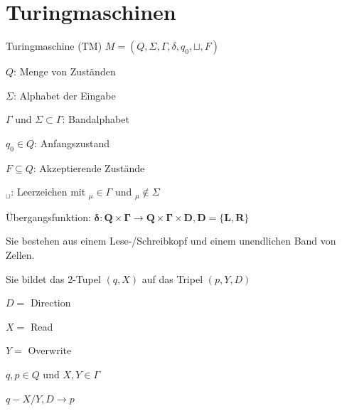 \graphicspath{{images/}}

\section*{Turingmaschinen}

\begin{theorem}{Turingmaschine (TM)} $M=\left(Q, \Sigma, \Gamma, \delta, q_{0}, \sqcup , F\right)$

    \begin{minipage}{0.45\linewidth}
        $Q$: Menge von Zuständen

        $\Sigma$: Alphabet der Eingabe

        $\Gamma$ und $\Sigma \subset \Gamma$: Bandalphabet
    \end{minipage}
    \begin{minipage}{0.55\linewidth}
        $q_{0} \in Q$: Anfangszustand

        $F \subseteq Q$: Akzeptierende Zustände

        ${ }_{\sqcup }$: Leerzeichen mit ${ }_{\mu} \in \Gamma$ und ${ }_{\mu} \notin \Sigma$
    \end{minipage}

    Übergangsfunktion: $\boldsymbol{\delta}: \boldsymbol{Q} \times \boldsymbol{\Gamma} \rightarrow \boldsymbol{Q} \times \boldsymbol{\Gamma} \times \boldsymbol{D}, \boldsymbol{D}=\{\boldsymbol{L}, \boldsymbol{R}\}$
    
    \vspace{1mm}

    Sie bestehen aus einem Lese-/Schreibkopf und einem unendlichen Band von Zellen.

    \vspace{1mm}

    Sie bildet das 2-Tupel $(q, X)$ auf das Tripel $(p, Y, D)$

    \begin{minipage}{0.45\linewidth}
        $D=$ Direction

        $X=$ Read

        $Y=$ Overwrite
    \end{minipage}
    \begin{minipage}{0.5\linewidth}
       $q, p \in Q$ und $X, Y \in \Gamma$

       \emph{$q-X / Y, D \rightarrow p$}
    \end{minipage}

\end{theorem}

